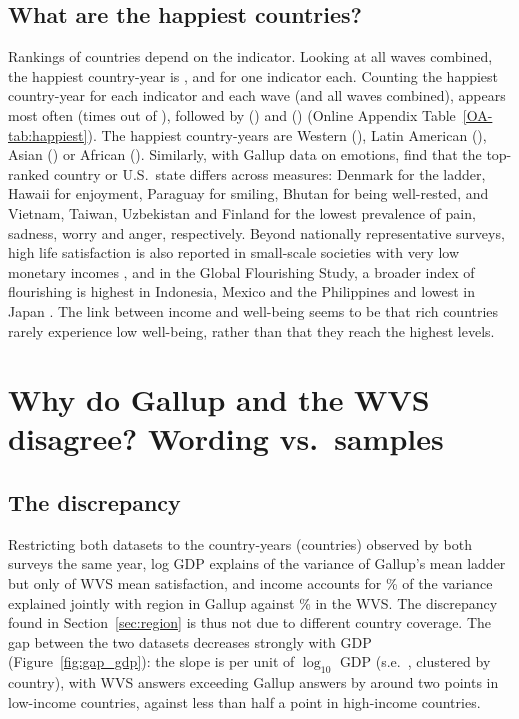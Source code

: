 \documentclass[12pt]{article}
\begin{document}
\subsection{What are the happiest countries?}\label{subsec:happiest}
Rankings of countries depend on the indicator. Looking at all waves combined, the happiest country-year is \happiestAllWavesTop, and \happiestAllWavesOthers for one indicator each. Counting the happiest country-year for each indicator and each wave (and all waves combined), \happiestFirst appears most often (\happiestFirstN times out of \nHappiestCells), followed by \happiestSecond (\happiestSecondN) and \happiestThird (\happiestThirdN) (Online Appendix Table~\ref{OA-tab:happiest}). The happiest country-years are Western (\happiestRegionWestern), Latin American (\happiestRegionLatinAmerica), Asian (\happiestRegionAsia) or African (\happiestRegionAfrica). Similarly, with Gallup data on emotions, \citet{blanchflower_wellbeing_2024} find that the top-ranked country or U.S.\ state differs across measures: Denmark for the ladder, Hawaii for enjoyment, Paraguay for smiling, Bhutan for being well-rested, and Vietnam, Taiwan, Uzbekistan and Finland for the lowest prevalence of pain, sadness, worry and anger, respectively. Beyond nationally representative surveys, high life satisfaction is also reported in small-scale societies with very low monetary incomes \citep{galbraith_high_2024}, and in the Global Flourishing Study, a broader index of flourishing is highest in Indonesia, Mexico and the Philippines and lowest in Japan \citep{vanderweele_global_2025}. The link between income and well-being seems to be that rich countries rarely experience low well-being, rather than that they reach the highest levels.


\section{Why do Gallup and the WVS disagree? Wording vs.\ samples}\label{sec:discrepancy}
\subsection{The discrepancy}\label{subsec:global_gap}

Restricting both datasets to the \nCommon country-years (\nCommonCountries countries) observed by both surveys the same year, log GDP explains \RtwoCommonGallup of the variance of Gallup's mean ladder but only \RtwoCommonWVS of WVS mean satisfaction, and income accounts for \shareIncomeCommonGallup\% of the variance explained jointly with region in Gallup against \shareIncomeCommonWVS\% in the WVS. The discrepancy found in Section~\ref{sec:region} is thus not due to different country coverage. The gap between the two datasets decreases strongly with GDP (Figure~\ref{fig:gap_gdp}): the slope is \slopeGapGDP per unit of $\log_{10}$ GDP (s.e.\ \seSlopeGapGDP, clustered by country), with WVS answers exceeding Gallup answers by around two points in low-income countries, against less than half a point in high-income countries.
\end{document}
